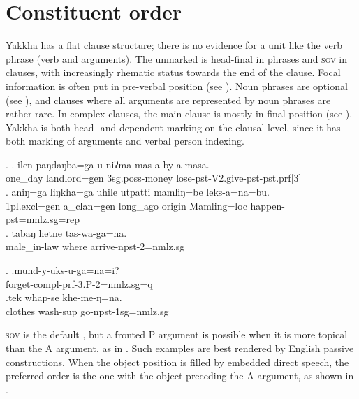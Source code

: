  
\section{Constituent order}\label{simp-cl2}

Yakkha has a flat clause structure; there is no evidence for  a unit like the verb phrase (verb and arguments). The unmarked  is head-final in phrases and \textsc{sov} in clauses, with increasingly rhematic status towards the end of the clause. Focal information is often put in pre-verbal position (see \Next). Noun phrases are optional (see \NNext[a]), and clauses where all arguments are represented by noun phrases are rather rare. In complex clauses, the main clause is mostly in final position (see \NNext[b]). Yakkha is both head- and dependent-marking on the clausal level, since it has both  marking of arguments and verbal person indexing. 

\ex. \ag. ilen paŋdaŋba=ga    u-niʔma   mas-a-by-a-masa.\\
 one\_day landlord{\sc =gen} {\sc 3sg.poss-}money lose{\sc -pst-V2.give-pst-pst.prf[3]}\\
 \bg.  aniŋ=ga         liŋkha=ga      uhile         utpatti mamliŋ=be      leks-a=na=bu.\\
 	{\sc 1pl.excl=gen}  a\_clan{\sc =gen} long\_ago origin  Mamling{\sc =loc} happen{\sc -pst=nmlz.sg=rep}\\
 	 
 \bg. tabaŋ hetne tas-wa-ga=na.\\
 	male\_in-law where arrive-{\sc npst-2=nmlz.sg}\\
 
 \ex. \ag.mund-y-uks-u-ga=na=i?\\
 forget{\sc -compl-prf-3.P-2=nmlz.sg=q}\\
 \bg.tek whap-se khe-me-ŋ=na.\\
clothes wash{\sc -sup} go{\sc -npst-1sg=nmlz.sg}\\

 
\textsc{sov} is the default , but a fronted P argument is possible when it is more topical than the A argument, as in  \Next[a]. Such examples are best rendered by English passive constructions. When the object position is filled by embedded direct speech, the preferred order is the one with the object preceding the A argument, as shown in \Next[b]. 

